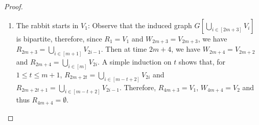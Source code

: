 \documentclass[runningheads]{llncs}
\begin{document}
\begin{proof}
\begin{enumerate}
    \item The rabbit starts in $V_1$: {Observe that the induced graph $G[\bigcup_{i \in[2m+3]} V_{i}]$ is bipartite, therefore, since $R_1=V_1$ and $W_{2m+3} = V_{2m+3}$, we have $R_{2m+3} = \bigcup_{i \in[m+1]} V_{2i-1} $. }%
    Then at time $2m+4$, we have $W_{2m+4} = V_{2m+2}$ and  $R_{2m+4} = \bigcup_{i \in[m]} V_{2i}$. A simple induction on $t$ shows that, for $1\le t\le m+1$, $R_{2m + 2t} = \bigcup_{i \in[m-t+2]} V_{2i}$ and
    $R_{2m + 2t + 1} = \bigcup_{i \in[m-t+2]} V_{2i-1}$. Therefore, {$R_{4m+3} =V_1$,} $W_{4m+4} = V_2$ and thus $R_{4m+4} = \emptyset$.
\end{enumerate}


\end{proof}
\end{document}
